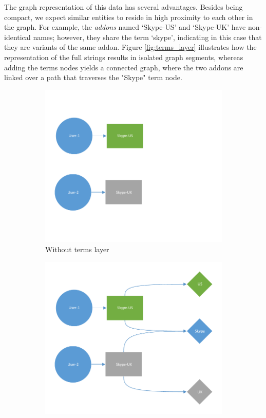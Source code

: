 \documentclass[11pt,oneside]{book}
\begin{document}
The graph representation of this data has several advantages. Besides being compact, we expect similar entities to reside in high proximity to each other in the graph. For example, the {\it addons} named `Skype-US' and `Skype-UK' have non-identical names; however, they share the term `skype', indicating in this case that they are variants of the same addon. Figure \ref{fig:terms_layer} illustrates how the representation of the full strings results in isolated graph segments, whereas adding the terms nodes yields a connected graph, where the two addons are linked over a path that traverses the "Skype" term node.

\begin{figure}[!htbp]
\centering
\begin{subfigure}[b]{0.49\textwidth}
	\centering
	\includegraphics[width=\textwidth]{figures/skype_exampe1.pdf}
	\caption{Without terms layer}
\end{subfigure}
\begin{subfigure}[b]{0.49\textwidth}
	\centering
	\includegraphics[width=\textwidth]{figures/skype_exampe2.pdf}

\end{subfigure}
\end{figure}
\end{document}

